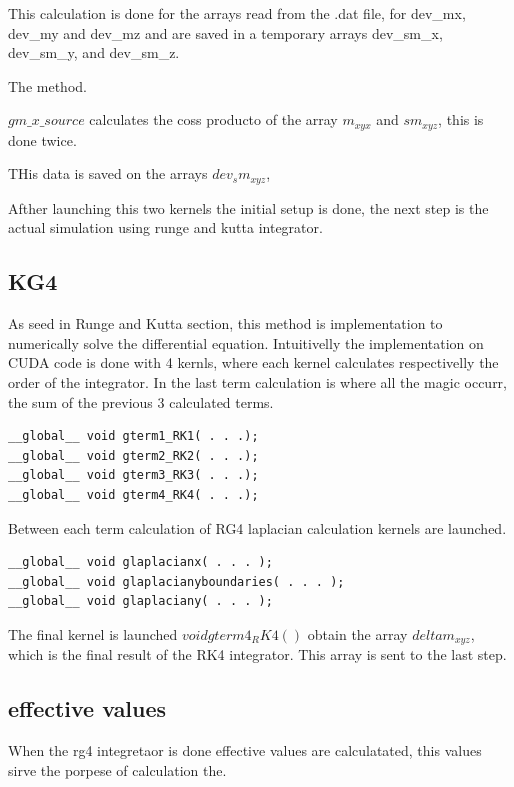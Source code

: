 This calculation is done for the arrays read from the .dat file, for dev\_mx, dev\_my and dev\_mz and are saved in a temporary arrays dev\_sm\_x, dev\_sm\_y, and dev\_sm\_z.

The method.

$gm\_x\_source$ calculates the coss producto of the array $m_{xyx}$ and $sm_{xyz}$, this is done twice.

THis data is saved on the arrays $dev_sm_{xyz}$,

Afther launching this two kernels the initial setup is done, the next step is the actual simulation using runge and kutta integrator.


\subsection{KG4}

As seed  in Runge and Kutta section, this method is implementation to numerically solve the differential equation. Intuitivelly the implementation on CUDA code is done with 4 kernls, where each kernel calculates respectivelly the order of the integrator. In the last term calculation is where all the magic occurr, the sum of the previous 3 calculated terms.

\begin{lstlisting}[frame=none]
__global__ void gterm1_RK1( . . .);
__global__ void gterm2_RK2( . . .);
__global__ void gterm3_RK3( . . .);
__global__ void gterm4_RK4( . . .);
\end{lstlisting}

Between each term calculation of RG4 laplacian calculation kernels are launched.

\begin{lstlisting}[frame=none]
__global__ void glaplacianx( . . . );
__global__ void glaplacianyboundaries( . . . );
__global__ void glaplaciany( . . . );
\end{lstlisting}

The final kernel is launched $void gterm4_RK4()$ obtain the array $deltam_{xyz}$, which is the final result of the RK4 integrator. This array is sent to the last step.

\subsection{effective values}

When the rg4 integretaor is done effective values are calculatated, this values sirve the porpese of calculation  the.


